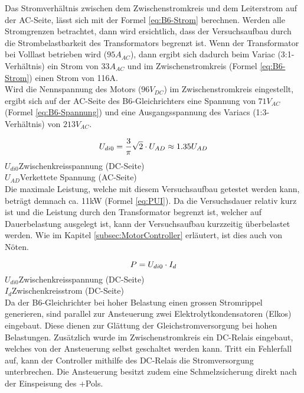 Das Stromverhältnis zwischen dem Zwischenstromkreis und dem Leiterstrom auf der AC-Seite, lässt sich mit der Formel \ref{eq:B6-Strom} berechnen. Werden alle Stromgrenzen betrachtet, dann wird ersichtlich, dass der Versuchsaufbau durch die Strombelastbarkeit des Transformators begrenzt ist. Wenn der Transformator bei Volllast betrieben wird ($95A_{AC}$), dann ergibt sich dadurch beim Variac (3:1-Verhältnis) ein Strom von $33A_{AC}$ und im Zwischenstromkreis (Formel \ref{eq:B6-Strom}) einen Strom von 116A.\\
Wird die Nennspannung des Motors ($96V_{DC}$) im Zwischenstromkreis eingestellt, ergibt sich auf der AC-Seite des B6-Gleichrichters eine Spannung von $71V_{AC}$ (Formel \ref{eq:B6-Spannung}) und eine Ausgangsspannung des Variacs (1:3-Verhältnis) von $213V_{AC}$.

\begin{equation}
\centering
U_{di0}=\frac{3}{\pi}\sqrt{2}\cdot U_{AD}\approx 1.35U_{AD}
\label{eq:B6-Spannung}
\end{equation}
$  U_{di0} $\quad  Zwischenkreisspannung (DC-Seite)      \\
$ U_{AD} $\quad  Verkettete Spannung (AC-Seite)        \\

Die maximale Leistung, welche mit diesem Versuchsaufbau getestet werden kann, beträgt demnach ca. 11kW (Formel \ref{eq:PUI}). Da die Versuchsdauer relativ kurz ist und die Leistung durch den Transformator begrenzt ist, welcher auf Dauerbelastung ausgelegt ist, kann der Versuchsaufbau kurzzeitig überbelastet werden. Wie im Kapitel \ref{subsec:MotorController} erläutert, ist dies auch von Nöten.

\begin{equation}
\centering
P=U_{di0}\cdot I_{d}
\label{eq:PUI}
\end{equation}
$  U_{di0} $\quad  Zwischenkreisspannung (DC-Seite)      \\
$ I_{d} $\quad\quad 	Zwischenkreisstrom (DC-Seite)      \\


Da der B6-Gleichrichter bei hoher Belastung einen grossen Stromrippel generieren, sind parallel zur Ansteuerung zwei Elektrolytkondensatoren (Elkos) eingebaut. Diese dienen zur Glättung der Gleichstromversorgung bei hohen Belastungen. Zusätzlich wurde im Zwischenstromkreis ein DC-Relais eingebaut, welches von der Ansteuerung selbst geschaltet werden kann. Tritt ein Fehlerfall auf, kann der Controller mithilfe des DC-Relais die Stromversorgung unterbrechen. Die Ansteuerung besitzt zudem eine Schmelzsicherung direkt nach der Einspeisung des +Pols.\\

